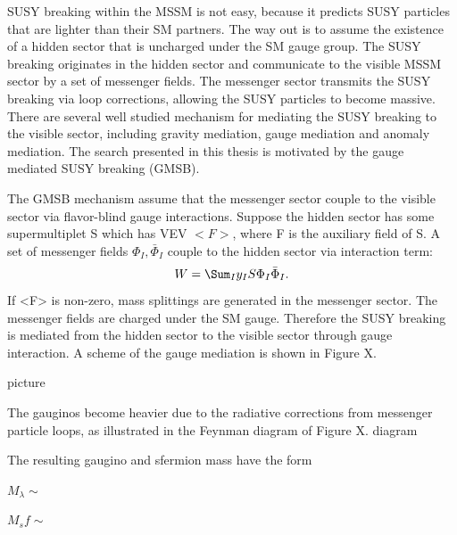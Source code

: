 \documentclass[thesis.tex]{subfiles}
\begin{document}
SUSY breaking within the MSSM is not easy, because it predicts SUSY particles that are lighter than their SM partners. 
The way out is to assume the existence of a hidden sector that is uncharged under the SM gauge group. 
The SUSY breaking originates in the hidden sector and communicate to the visible MSSM sector by a set of messenger fields. 
The messenger sector transmits the SUSY breaking via loop corrections, allowing the SUSY particles to become massive. 
There are several well studied mechanism for mediating the SUSY breaking to the visible sector, including gravity mediation, gauge mediation and anomaly mediation. 
The search presented in this thesis is motivated by the gauge mediated SUSY breaking (GMSB). 

The GMSB mechanism assume that the messenger sector couple to the visible sector via flavor-blind gauge interactions. 
Suppose the hidden sector has some supermultiplet S which has VEV $<F>$, where F is the auxiliary field of S. 
A set of messenger fields ${\Phi_I, \bar{\Phi}_I}$ couple to the hidden sector via interaction term:
	 \begin{equation}
	W = \Sum_I y_I S \Phi_I \bar{\Phi}_I.
	\end{equation}
If <F> is non-zero, mass splittings are generated in the messenger sector. 
The messenger fields are charged under the SM gauge. 
Therefore the SUSY breaking is mediated from the hidden sector to the visible sector through gauge interaction. A scheme of the gauge mediation is shown in Figure X. 

picture

The gauginos become heavier due to the radiative corrections from messenger particle loops, as illustrated in the Feynman diagram of Figure X. 
 	diagram

The resulting gaugino and sfermion mass have the form

	$M_\lambda \sim $ 
	
	$M_sf \sim$
\end{document}
